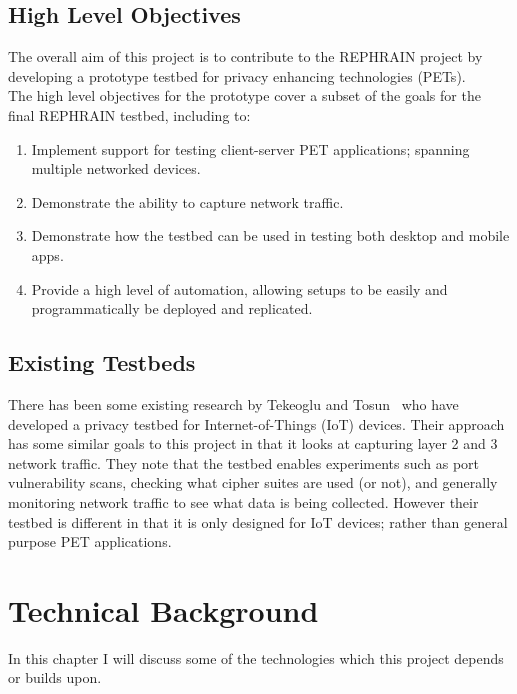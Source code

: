 \documentclass[
    author={Jacob Daniel Halsey},
    supervisor={Prof. Awais Rashid},
    degree={BSc},
    title={Building a Testbed for Evaluating Privacy Enhancing Technologies  (PETs)},
    subtitle={},
    type={software development},
    year={2021}
]{dissertation}
\begin{document}
\section{High Level Objectives}
\label{sect:objectives}

The overall aim of this project is to contribute to the REPHRAIN project
by developing a prototype testbed for privacy enhancing technologies (PETs). \\

The high level objectives for the prototype cover a subset 
of the goals for the final REPHRAIN testbed, including to:

\begin{enumerate}
	\item Implement support for testing client-server PET applications; spanning multiple
	networked devices.
	\item Demonstrate the ability to capture network traffic.
	\item Demonstrate how the testbed can be used in testing both desktop and mobile apps.
	\item Provide a high level of automation, allowing setups to be easily 
	and programmatically be deployed and replicated.
\end{enumerate}

\section{Existing Testbeds}

There has been some existing research by Tekeoglu and Tosun~\cite{tekeoglu_2016_testbed} who have developed 
a privacy testbed for Internet-of-Things (IoT) devices. Their approach has some similar goals to this project 
in that it looks at capturing layer 2 and 3 network traffic. They note that the testbed enables experiments such
as port vulnerability scans, checking what cipher suites are used (or not), and generally monitoring 
network traffic to see what data is being collected. However their testbed is different in that it is only designed
for IoT devices; rather than general purpose PET applications.

\chapter{Technical Background}
\label{chap:technical}

In this chapter I will discuss some of the technologies which this project depends or builds upon.
\end{document}
